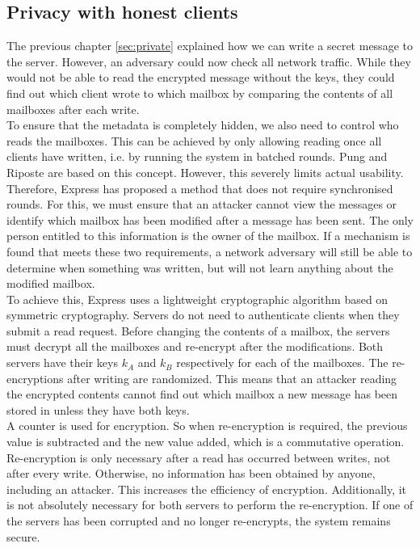 \documentclass[a4paper]{article}
\begin{document}
\subsection{Privacy with honest clients}
The previous chapter \ref{sec:private} explained how we can write a secret message to the server. However, an adversary could now check all network traffic. While they would not be able to read the encrypted message without the keys, they could find out which client wrote to which mailbox by comparing the contents of all mailboxes after each write. \\
To ensure that the metadata is completely hidden, we also need to control who reads the mailboxes. This can be achieved by only allowing reading once all clients have written, i.e. by running the system in batched rounds. Pung and Riposte are based on this concept. However, this severely limits actual usability. Therefore, Express has proposed a method that does not require synchronised rounds. For this, we must ensure that an attacker cannot view the messages or identify which mailbox has been modified after a message has been sent. The only person entitled to this information is the owner of the mailbox. If a mechanism is found that meets these two requirements, a network adversary will still be able to determine when something was written, but will not learn anything about the modified mailbox.\\
To achieve this, Express uses a lightweight cryptographic algorithm based on symmetric cryptography. Servers do not need to authenticate clients when they submit a read request. Before changing the contents of a mailbox, the servers must decrypt all the mailboxes and re-encrypt after the modifications. Both servers have their keys $k_A$ and $k_B$ respectively for each of the mailboxes. The re-encryptions after writing are randomized. This means that an attacker reading the encrypted contents cannot find out which mailbox a new message has been stored in unless they have both keys. \\
A counter is used for encryption. So when re-encryption is required, the previous value is subtracted and the new value added, which is a commutative operation. Re-encryption is only necessary after a read has occurred between writes, not after every write. Otherwise, no information has been obtained by anyone, including an attacker. This increases the efficiency of encryption. Additionally, it is not absolutely necessary for both servers to perform the re-encryption. If one of the servers has been corrupted and no longer re-encrypts, the system remains secure. 
\end{document}
